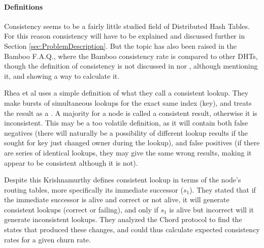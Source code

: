 \paragraph{Definitions}
Consistency seems to be a fairly little studied field of Distributed Hash Tables.
 For this reason consistency will have to be explained and discussed further in
 Section \ref{sec:ProblemDescription}. But the topic has also been raised in the
 Bamboo F.A.Q.\cite{bamboo-homepage}, where the Bamboo consistency rate is compared
 to other DHTs, though the definition of consistency is not discussed in
 \cite{rhea-04-handling-churn} nor \cite{sit-02-security}, although mentioning it,
 and showing a way to calculate it.

Rhea et al uses a simple definition of what they call a consistent lookup. They
 make bursts of simultaneous lookups for the exact same index (key), and treats
 the result as a . A majority for a node is called a consistent result,
 otherwise it is inconsistent. This may be a too volatile definition, as it will
 contain both false negatives (there will naturally be a possibility of different
 lookup results if the sought for key just changed owner during the lookup), and
 false positives (if there are series of identical lookups, they may give the
 same wrong results, making it appear to be consistent although it is not).

Despite this Krishnamurthy\cite{krishnamurthy-05-statistical} defines consistent
 lookup in terms of the node's routing tables, more specifically its immediate
 successor ($s_1$).
 They stated that if the immediate successor is alive and correct or not alive, it
 will generate consistent lookups (correct or failing), and only if $s_1$ is alive
 but incorrect will it generate inconsistent lookups. They analyzed the Chord
 protocol to find the states that produced these changes, and could thus calculate
 expected consistency rates for a given churn rate.
